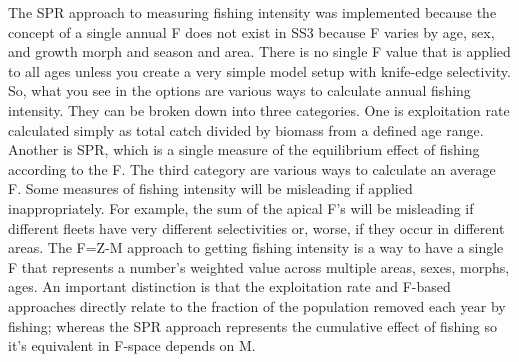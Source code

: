 The SPR approach to measuring fishing intensity was implemented because the concept of a single annual F does not exist in SS3 because F varies by age, sex, and growth morph and season and area.  There is no single F value that is applied to all ages unless you create a very simple model setup with knife-edge selectivity.  So, what you see in the options are various ways to calculate annual fishing intensity.  They can be broken down into three categories.  One is exploitation rate calculated simply as total catch divided by biomass from a defined age range. Another is SPR, which is a single measure of the equilibrium effect of fishing according to the F.  The third category are various ways to calculate an average F. Some measures of fishing intensity will be misleading if applied inappropriately. For example, the sum of the apical F's will be misleading if different fleets have very different selectivities or, worse, if they occur in different areas. The F=Z-M approach to getting fishing intensity is a way to have a single F that represents a number's weighted value across multiple areas, sexes, morphs, ages. An important distinction is that the exploitation rate and F-based approaches directly relate to the fraction of the population removed each year by fishing; whereas the SPR approach represents the cumulative effect of fishing so it's equivalent in F-space depends on M.

